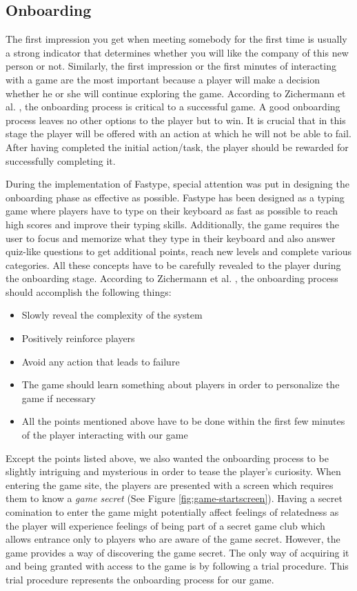 \subsection{Onboarding}
The first impression you get when meeting somebody for the first time is usually a strong indicator that determines whether you will like the company of this new person or not. Similarly, the first impression or the first minutes of interacting with a game are the most important because a player will make a decision whether he or she will continue exploring the game. According to Zichermann et al. \cite{48}, the onboarding process is critical to a successful game. A good onboarding process leaves no other options to the player but to win. It is crucial that in this stage the player will be offered with an action at which he will not be able to fail. After having completed the initial action/task, the player should be rewarded for successfully completing it. \cite{48, 43, 48}

During the implementation of Fastype, special attention was put in designing the onboarding phase as effective as possible. Fastype has been designed as a typing game where players have to type on their keyboard as fast as possible to reach high scores and improve their typing skills. Additionally, the game requires the user to focus and memorize what they type in their keyboard and also answer quiz-like questions to get additional points, reach new levels and complete various categories. All these concepts have to be carefully revealed to the player during the onboarding stage. According to Zichermann et al. \cite{48}, the onboarding process should accomplish the following things: 
\begin{itemize}
    \item Slowly reveal the complexity of the system
    \item Positively reinforce players
    \item Avoid any action that leads to failure
    \item The game should learn something about players in order to personalize the game if necessary 
    \item All the points mentioned above have to be done within the first few minutes of the player interacting with our game
\end{itemize}

Except the points listed above, we also wanted the onboarding process to be slightly intriguing and mysterious in order to tease the player's curiosity. When entering the game site, the players are presented with a screen which requires them to know a \textit{ game secret} (See Figure \ref{fig:game-startscreen}). Having a secret comination to enter the game might potentially affect feelings of relatedness as the player will experience feelings of being part of a secret game club which allows entrance only to players who are aware of the game secret. However, the game provides a way of discovering the game secret. The only way of acquiring it and being granted with access to the game is by following a trial procedure. This trial procedure represents the onboarding process for our game. 

